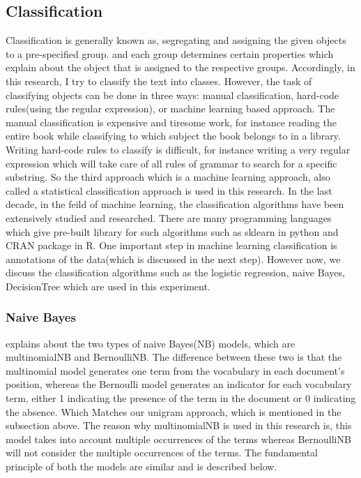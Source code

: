 \subsection{Classification}
Classification is generally known as, segregating and assigning the given objects to a pre-specified group. and each group determines certain properties which explain about the object that is assigned to the respective groups. Accordingly, in this research, I try to classify the text into classes. However, the task of classifying objects can be done in three ways:  manual classification, hard-code rules(using the regular expression), or machine learning based approach. The manual classification is expensive and tiresome work, for instance reading the entire book while classifying to which subject the book belongs to in a library. Writing hard-code rules to classify is difficult, for instance writing a very regular expression which will take care of all rules of grammar to search for a specific substring. So the third approach which is a machine learning approach, also called a statistical classification approach is used in this research. In the last decade, in the feild of machine learning, the classification algorithms have been extensively studied and researched. There are many programming languages which give pre-built library for such algorithms such as sklearn \cite{scikit-learn} in python and  CRAN package in R. One important step in machine learning classification is annotations of the data(which is discussed in the next step). However now, we discuss the classification algorithms such as the logistic regression, naive Bayes, DecisionTree which are used in this experiment.

\subsubsection{Naive Bayes}

\cite{Manning:2008} explains about the two types of naive Bayes(NB) models, which are multinomialNB and BernoulliNB. The difference between these two is that the multinomial model generates one term from the vocabulary in each document's position, whereas the Bernoulli model generates an indicator for each vocabulary term, either 1 indicating the presence of the term in the document or 0 indicating the absence. Which Matches  our unigram approach, which is mentioned in the subsection above. The reason why multinomialNB is used in this research is, this model takes into account multiple occurrences of the terms whereas BernoulliNB will not consider the multiple occurrences of the terms. The fundamental principle of both the models are similar and is described below.

